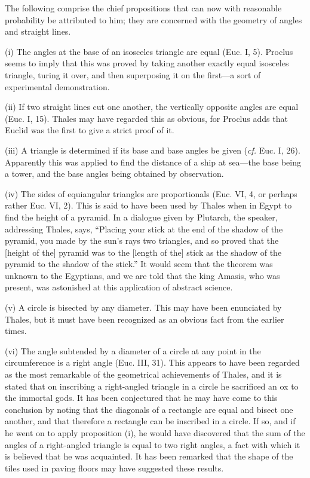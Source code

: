 \documentclass[12pt,oneside]{book}
\begin{document}
The following comprise the chief propositions that can now with reasonable probability be attributed to him; they are concerned with the geometry of angles and straight lines. \par 

\hfill\begin{minipage}{\dimexpr\textwidth-2cm}
(i) The angles at the base of an isosceles triangle are equal (Euc. I, 5). Proclus seems to imply that this was proved by taking another exactly equal isosceles triangle, turing it over, and then superposing it on the first---a sort of experimental demonstration. \par 

(ii) If two straight lines cut one another, the vertically opposite angles are equal (Euc. I, 15). Thales may have regarded this as obvious, for Proclus adds that Euclid was the first to give a strict proof of it. \par 

(iii) A triangle is determined if its base and base angles be given (\textit{cf.} Euc. I, 26). Apparently this was applied to find the distance of a ship at sea---the base being a tower, and the base angles being obtained by observation. \par 

(iv) The sides of equiangular triangles are proportionals (Euc. VI, 4, or perhaps rather Euc. VI, 2). This is said to have been used by Thales when in Egypt to find the height of a pyramid. In a dialogue given by Plutarch, the speaker, addressing Thales, says, ``Placing your stick at the end of the shadow of the pyramid, you made by the sun's rays two triangles, and so proved that the [height of the] pyramid was to the [length of the] stick as the shadow of the pyramid to the shadow of the stick.'' It would seem that the theorem was unknown to the Egyptians, and we are told that the king Amasis, who was present, was astonished at this application of abstract science. \par 

(v) A circle is bisected by any diameter. This may have been enunciated by Thales, but it must have been recognized as an obvious fact from the earlier times. \par 

(vi) The angle subtended by a diameter of a circle at any point in the circumference is a right angle (Euc. III, 31). This appears to have been regarded as the most remarkable of the geometrical achievements of Thales, and it is stated that on inscribing a right-angled triangle in a circle he sacrificed an ox to the immortal gods. It has been conjectured that he may have come to this conclusion by noting that the diagonals of a rectangle are equal and bisect one another, and that therefore a rectangle can be inscribed in a circle. If so, and if he went on to apply proposition (i), he would have discovered that the sum of the angles of a right-angled triangle is equal to two right angles, a fact with which it is believed that he was acquainted. It has been remarked that the shape of the tiles used in paving floors may have suggested these results. \par 
\end{minipage}
\end{document}
